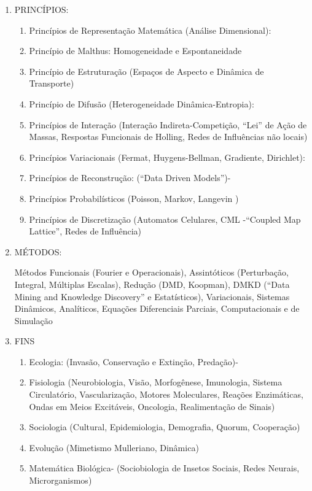 \begin{enumerate}
\item PRINCÍPIOS:

\begin{enumerate}
\item Princípios de Representação Matemática (Análise Dimensional):
\item Princípio de Malthus: Homogeneidade e Espontaneidade
\item Princípio de Estruturação (Espaços de Aspecto e Dinâmica de Transporte)
\item Princípio de Difusão (Heterogeneidade Dinâmica-Entropia):
\item Princípios de Interação (Interação Indireta-Competição, “Lei” de Ação de Massas, Respostas Funcionais de Holling, Redes de
Influências não locais)
\item Princípios Variacionais (Fermat, Huygens-Bellman, Gradiente, Dirichlet):
\item Princípios de Reconstrução: (“Data Driven Models”)-
\item Princípios Probabilísticos (Poisson, Markov, Langevin )
\item Princípios de Discretização (Automatos Celulares, CML -``Coupled Map Lattice'', Redes de Influência)
\end{enumerate}

\item MÉTODOS:

Métodos Funcionais (Fourier e Operacionais), Assintóticos (Perturbação, Integral, Múltiplas Escalas), Redução (DMD, Koopman), DMKD (``Data Mining and Knowledge Discovery'' e Estatísticos), Variacionais, Sistemas Dinâmicos, Analíticos, Equações Diferenciais Parciais, Computacionais e de Simulação

\item FINS

\begin{enumerate}
\item Ecologia: (Invasão, Conservação e Extinção, Predação)-
\item Fisiologia (Neurobiologia, Visão, Morfogênese, Imunologia, Sistema Circulatório, Vascularização, Motores Moleculares, Reações Enzimáticas, Ondas em Meios Excitáveis, Oncologia, Realimentação de Sinais)
\item Sociologia (Cultural, Epidemiologia, Demografia, Quorum, Cooperação)
\item Evolução (Mimetismo Mulleriano, Dinâmica)
\item Matemática Biológica- (Sociobiologia de Insetos Sociais, Redes Neurais, Microrganismos)
\end{enumerate}


\end{enumerate}
